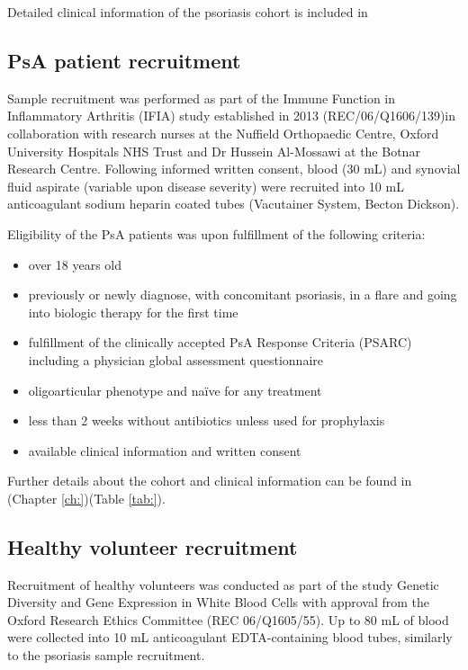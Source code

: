 Detailed clinical information of the psoriasis cohort is included in %

\subsection{PsA patient recruitment}
Sample recruitment was performed as part of the Immune Function in Inflammatory Arthritis (IFIA) study established in 2013 (REC/06/Q1606/139)in collaboration with research nurses at the Nuffield Orthopaedic Centre, Oxford University Hospitals NHS Trust and Dr Hussein Al-Mossawi at the Botnar Research Centre. Following informed written consent, blood (30 mL) and synovial fluid aspirate (variable upon disease severity) were recruited into 10 mL anticoagulant sodium heparin coated tubes (Vacutainer System, Becton Dickson).

Eligibility of the PsA patients was upon fulfillment of the following criteria:
\begin{itemize}
  \item over 18 years old
  \item previously or newly diagnose, with concomitant psoriasis, in a flare and going into biologic therapy for the first time %
	\item fulfillment of the clinically accepted PsA Response Criteria (PSARC) including a physician global assessment questionnaire \parencite{Philipp2011,Clegg1996}
	\item oligoarticular phenotype and na\"{i}ve for any treatment
	\item less than 2 weeks without antibiotics unless used for prophylaxis %
	\item available clinical information and written consent
\end{itemize}

Further details about the cohort and clinical information can be found in (Chapter \ref{ch:})(Table \ref{tab:}).

\subsection{Healthy volunteer recruitment}
Recruitment of healthy volunteers was conducted as part of the study Genetic Diversity and Gene Expression in White Blood Cells with approval from the Oxford Research Ethics Committee (REC 06/Q1605/55). Up to 80 mL of blood were collected into 10 mL anticoagulant EDTA-containing blood tubes, similarly to the psoriasis sample recruitment.

